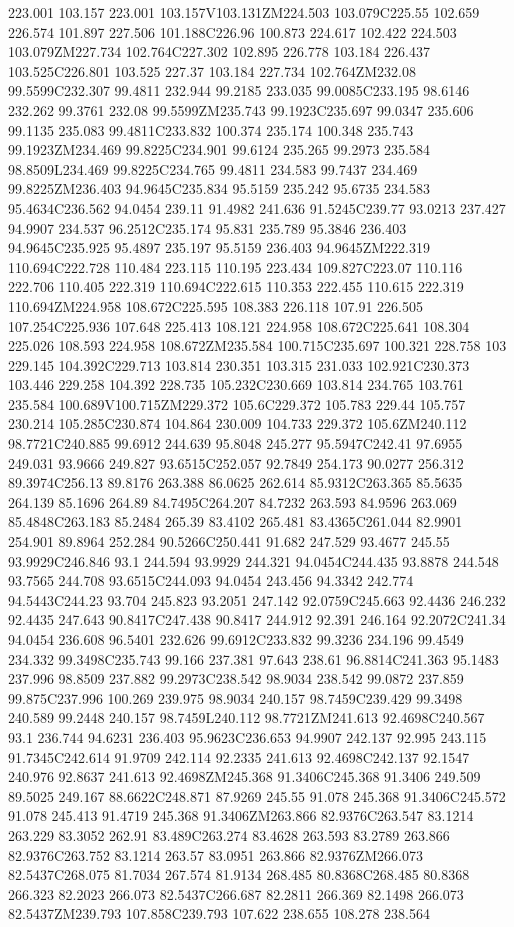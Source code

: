 223.001 103.157 223.001 103.157V103.131ZM224.503 103.079C225.55 102.659 226.574 101.897 227.506 101.188C226.96 100.873 224.617 102.422 224.503 103.079ZM227.734 102.764C227.302 102.895 226.778 103.184 226.437 103.525C226.801 103.525 227.37 103.184 227.734 102.764ZM232.08 99.5599C232.307 99.4811 232.944 99.2185 233.035 99.0085C233.195 98.6146 232.262 99.3761 232.08 99.5599ZM235.743 99.1923C235.697 99.0347 235.606 99.1135 235.083 99.4811C233.832 100.374 235.174 100.348 235.743 99.1923ZM234.469 99.8225C234.901 99.6124 235.265 99.2973 235.584 98.8509L234.469 99.8225C234.765 99.4811 234.583 99.7437 234.469 99.8225ZM236.403 94.9645C235.834 95.5159 235.242 95.6735 234.583 95.4634C236.562 94.0454 239.11 91.4982 241.636 91.5245C239.77 93.0213 237.427 94.9907 234.537 96.2512C235.174 95.831 235.789 95.3846 236.403 94.9645C235.925 95.4897 235.197 95.5159 236.403 94.9645ZM222.319 110.694C222.728 110.484 223.115 110.195 223.434 109.827C223.07 110.116 222.706 110.405 222.319 110.694C222.615 110.353 222.455 110.615 222.319 110.694ZM224.958 108.672C225.595 108.383 226.118 107.91 226.505 107.254C225.936 107.648 225.413 108.121 224.958 108.672C225.641 108.304 225.026 108.593 224.958 108.672ZM235.584 100.715C235.697 100.321 228.758 103 229.145 104.392C229.713 103.814 230.351 103.315 231.033 102.921C230.373 103.446 229.258 104.392 228.735 105.232C230.669 103.814 234.765 103.761 235.584 100.689V100.715ZM229.372 105.6C229.372 105.783 229.44 105.757 230.214 105.285C230.874 104.864 230.009 104.733 229.372 105.6ZM240.112 98.7721C240.885 99.6912 244.639 95.8048 245.277 95.5947C242.41 97.6955 249.031 93.9666 249.827 93.6515C252.057 92.7849 254.173 90.0277 256.312 89.3974C256.13 89.8176 263.388 86.0625 262.614 85.9312C263.365 85.5635 264.139 85.1696 264.89 84.7495C264.207 84.7232 263.593 84.9596 263.069 85.4848C263.183 85.2484 265.39 83.4102 265.481 83.4365C261.044 82.9901 254.901 89.8964 252.284 90.5266C250.441 91.682 247.529 93.4677 245.55 93.9929C246.846 93.1 244.594 93.9929 244.321 94.0454C244.435 93.8878 244.548 93.7565 244.708 93.6515C244.093 94.0454 243.456 94.3342 242.774 94.5443C244.23 93.704 245.823 93.2051 247.142 92.0759C245.663 92.4436 246.232 92.4435 247.643 90.8417C247.438 90.8417 244.912 92.391 246.164 92.2072C241.34 94.0454 236.608 96.5401 232.626 99.6912C233.832 99.3236 234.196 99.4549 234.332 99.3498C235.743 99.166 237.381 97.643 238.61 96.8814C241.363 95.1483 237.996 98.8509 237.882 99.2973C238.542 98.9034 238.542 99.0872 237.859 99.875C237.996 100.269 239.975 98.9034 240.157 98.7459C239.429 99.3498 240.589 99.2448 240.157 98.7459L240.112 98.7721ZM241.613 92.4698C240.567 93.1 236.744 94.6231 236.403 95.9623C236.653 94.9907 242.137 92.995 243.115 91.7345C242.614 91.9709 242.114 92.2335 241.613 92.4698C242.137 92.1547 240.976 92.8637 241.613 92.4698ZM245.368 91.3406C245.368 91.3406 249.509 89.5025 249.167 88.6622C248.871 87.9269 245.55 91.078 245.368 91.3406C245.572 91.078 245.413 91.4719 245.368 91.3406ZM263.866 82.9376C263.547 83.1214 263.229 83.3052 262.91 83.489C263.274 83.4628 263.593 83.2789 263.866 82.9376C263.752 83.1214 263.57 83.0951 263.866 82.9376ZM266.073 82.5437C268.075 81.7034 267.574 81.9134 268.485 80.8368C268.485 80.8368 266.323 82.2023 266.073 82.5437C266.687 82.2811 266.369 82.1498 266.073 82.5437ZM239.793 107.858C239.793 107.622 238.655 108.278 238.564 